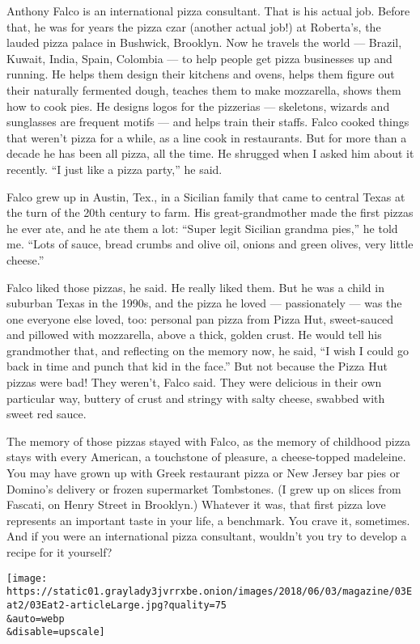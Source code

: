 Anthony Falco is an international pizza consultant. That is his actual
job. Before that, he was for years the pizza czar (another actual job!)
at Roberta's, the lauded pizza palace in Bushwick, Brooklyn. Now he
travels the world --- Brazil, Kuwait, India, Spain, Colombia --- to help
people get pizza businesses up and running. He helps them design their
kitchens and ovens, helps them figure out their naturally fermented
dough, teaches them to make mozzarella, shows them how to cook pies. He
designs logos for the pizzerias --- skeletons, wizards and sunglasses
are frequent motifs --- and helps train their staffs. Falco cooked
things that weren't pizza for a while, as a line cook in restaurants.
But for more than a decade he has been all pizza, all the time. He
shrugged when I asked him about it recently. ``I just like a pizza
party,'' he said.

Falco grew up in Austin, Tex., in a Sicilian family that came to central
Texas at the turn of the 20th century to farm. His great-grandmother
made the first pizzas he ever ate, and he ate them a lot: ``Super legit
Sicilian grandma pies,'' he told me. ``Lots of sauce, bread crumbs and
olive oil, onions and green olives, very little cheese.''

Falco liked those pizzas, he said. He really liked them. But he was a
child in suburban Texas in the 1990s, and the pizza he loved ---
passionately --- was the one everyone else loved, too: personal pan
pizza from Pizza Hut, sweet-sauced and pillowed with mozzarella, above a
thick, golden crust. He would tell his grandmother that, and reflecting
on the memory now, he said, ``I wish I could go back in time and punch
that kid in the face.'' But not because the Pizza Hut pizzas were bad!
They weren't, Falco said. They were delicious in their own particular
way, buttery of crust and stringy with salty cheese, swabbed with sweet
red sauce.

The memory of those pizzas stayed with Falco, as the memory of childhood
pizza stays with every American, a touchstone of pleasure, a
cheese-topped madeleine. You may have grown up with Greek restaurant
pizza or New Jersey bar pies or Domino's delivery or frozen supermarket
Tombstones. (I grew up on slices from Fascati, on Henry Street in
Brooklyn.) Whatever it was, that first pizza love represents an
important taste in your life, a benchmark. You crave it, sometimes. And
if you were an international pizza consultant, wouldn't you try to
develop a recipe for it yourself?

\texttt{[image: https://static01.graylady3jvrrxbe.onion/images/2018/06/03/magazine/03Eat2/03Eat2-articleLarge.jpg?quality=75\\\&auto=webp\\\&disable=upscale]}

